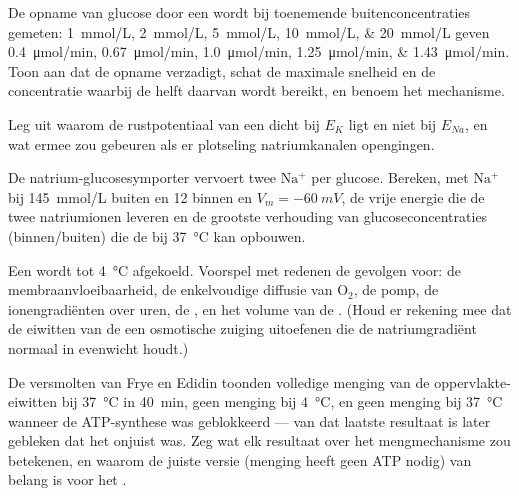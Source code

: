 \begin{exercise}[$\star\star$]\label{exo:b1:membranes-transport:7}
De opname van glucose door een  wordt bij toenemende buitenconcentraties
gemeten: \qtylist{1;2;5;10;20}{mmol/L} geven
\qtylist{0.4;0.67;1.0;1.25;1.43}{\micro mol/min}. Toon aan dat de opname
verzadigt, schat de maximale snelheid en de concentratie waarbij de helft daarvan
wordt bereikt, en benoem het mechanisme.
\end{exercise}

\begin{exercise}[$\star\star$]\label{exo:b1:membranes-transport:8}
Leg uit waarom de rustpotentiaal van een  dicht bij $E_K$ ligt en niet bij
$E_{Na}$, en wat ermee zou gebeuren als er plotseling natriumkanalen opengingen.
\end{exercise}

\begin{exercise}[$\star\star$]\label{exo:b1:membranes-transport:9}
De natrium-glucosesymporter vervoert twee $\mathrm{Na^+}$ per glucose. Bereken,
met $\mathrm{Na^+}$ bij \qty{145}{mmol/L} buiten en \qty{12}{} binnen en
$V_m = \qty{-60}{mV}$, de vrije energie die de twee natriumionen leveren en de
grootste verhouding van glucoseconcentraties (binnen/buiten) die de  bij
\qty{37}{\celsius} kan opbouwen.
\end{exercise}

\begin{exercise}[$\star\star\star$]\label{exo:b1:membranes-transport:10}
Een  wordt tot \qty{4}{\celsius} afgekoeld. Voorspel met redenen de gevolgen
voor: de membraanvloeibaarheid, de enkelvoudige diffusie van $\mathrm{O_2}$, de
pomp, de ionengradiënten over uren, de , en het volume van de
. (Houd er rekening mee dat de eiwitten van de  een osmotische zuiging
uitoefenen die de natriumgradiënt normaal in evenwicht houdt.)
\end{exercise}

\begin{exercise}[$\star\star\star$]\label{exo:b1:membranes-transport:11}
De versmolten  van Frye en Edidin toonden volledige menging van de
oppervlakte-eiwitten bij \qty{37}{\celsius} in \qty{40}{min}, geen menging bij
\qty{4}{\celsius}, en geen menging bij \qty{37}{\celsius} wanneer de ATP-synthese
was geblokkeerd --- van dat laatste resultaat is later gebleken dat het onjuist
was. Zeg wat elk resultaat over het mengmechanisme zou betekenen, en waarom de
juiste versie (menging heeft geen ATP nodig) van belang is voor het
.
\end{exercise}

